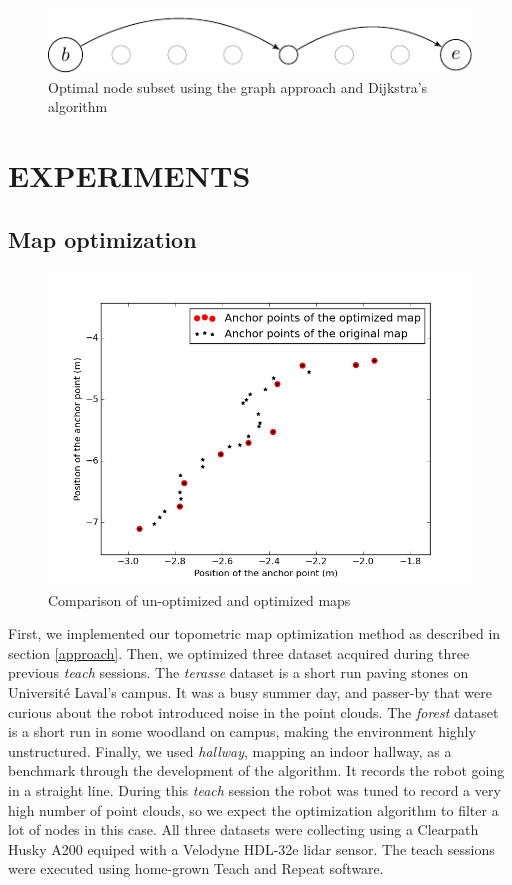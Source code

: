 \documentclass[letterpaper,10 pt,conference]{ieeeconf}
\begin{document}
\begin{figure}[thpb]
  \centering
  \includegraphics[scale=1.0]{optimized-graph}
  \caption{Optimal node subset using the graph approach and Dijkstra's algorithm}
\end{figure}


\section{EXPERIMENTS}

\subsection{Map optimization}

\begin{figure}
  \centering
  \includegraphics[scale=0.4]{map_optimization}
  \caption{Comparison of un-optimized and optimized maps}
\end{figure}

First, we implemented our topometric map optimization method as described in section \ref{approach}.
Then, we optimized three dataset acquired during three previous \textit{teach} sessions. The
\textit{terasse} dataset is a short run paving stones on Université Laval's campus. It was a busy
summer day, and passer-by that were curious about the robot introduced noise in the point
clouds. The \textit{forest} dataset is a short run in some woodland on campus, making the environment
highly unstructured. Finally, we used \textit{hallway}, mapping an indoor hallway, as a
benchmark through the development of the algorithm. It records the robot going in a straight line.
During this \textit{teach} session the robot was tuned to record a very high number of point clouds,
so we expect the optimization algorithm to filter a lot of nodes in this case. All three datasets
were collecting using a Clearpath Husky A200 equiped with a Velodyne HDL-32e lidar sensor. The teach
sessions were executed using home-grown Teach and Repeat software.
\end{document}
